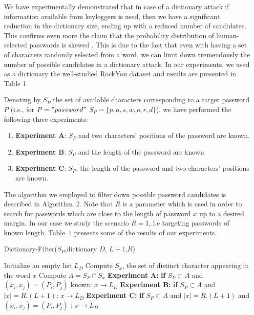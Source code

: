 \documentclass{llncs}
\begin{document}
We have experimentally
demonstrated that in case of a dictionary attack if information available from
keyloggers is used, then we have a significant reduction in the dictionary size,
ending up with a reduced number of candidates. This confirms
even more the claim that the probability distribution of
human-selected passwords is skewed \cite{bonneau,bonneau2}. This is due to
the fact that even with having a set of characters randomly selected from a word,
we can limit down tremendously the number of possible candidates in
a dictionary attack. In our experiments, we used as a dictionary the well-studied
RockYou dataset and results are presented in Table 1.

Denoting by $S_P$ the set of available characters
corresponding to a target password $P$ (i.e., for
$P="password"$ $S_P=\{p,a,s,w,o,r,d\}$), we have performed the following three experiments:

\begin{enumerate}
\item \textbf{Experiment A}: $S_P$ and two characters' positions of the password are known.
\item \textbf{Experiment B}: $S_P$ and the length of the password are known
\item \textbf{Experiment C}: $S_P$, the length of the password and two characters' positions are known.
\end{enumerate}

The algorithm we employed to filter down possible password candidates is described in Algorithm~$2$. Note that $R$ is a parameter which is used in order to search for passwords which are close to the length of password $x$ up to a desired margin. In our case we study the scenario
$R=1$, i.e targeting passwords of known length. Table~$1$ presents some
of the results of our experiments.

\newpage 

\begin{algorithm}[!htbp]
\caption{Dictionary-Filter($S_P$,dictionary $D$, $L+1$,$R$)}
\label{CHalgorithm}
\begin{algorithmic}[1]
\State Initialize an empty list $L_D$
\State Compute $S_x$, the set of distinct character appearing in the word $x$
\State Compute $A=S_P \cap S_x$
\State \textbf{Experiment A:}
\State \textbf{if} $S_P \subset A$ and $(x_i,x_j)=(P_i,P_j)$ known:
\State                  $  x\rightarrow L_D$
\State \textbf{Experiment B:}
\State \textbf{if} $S_P \subset A$ and $|x|=R.(L+1)$:
\State                  $  x\rightarrow L_D$
\State \textbf{Experiment C:}
\State \textbf{if} $S_P \subset A$ and $|x|=R.(L+1)$ and $(x_i,x_j)=(P_i,P_j)$ :
\State                  $  x\rightarrow L_D$
\EndFor
\end{algorithmic}
\end{algorithm}
\end{document}
